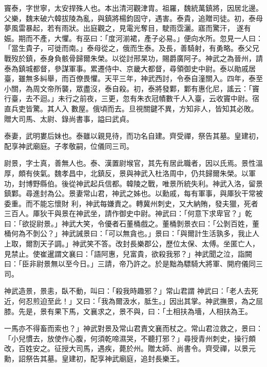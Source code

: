 \begin{pinyinscope}
 竇泰，字世寧，太安捍殊人也。本出清河觀津胄。祖羅，魏統萬鎮將，因居北邊。父樂，魏末破六韓拔陵為亂，與鎮將楊鈞固守，遇害。泰貴，追贈司徒。初，泰母夢風雷暴起，若有雨狀。出庭觀之，見電光奪目，駛雨霑灑。寤而驚汗，
 遂有娠。期而不產，大懼。有巫曰：「度河湔裙，產子必易。」便向水所。忽見一人曰：「當生貴子，可徙而南。」泰母從之，俄而生泰。及長，善騎射，有勇略。泰父兄戰歿於鎮，泰身負骸骨歸爾朱榮。以從討邢杲功，賜爵廣阿子。神武之為晉州，請泰為鎮城都督，參謀軍事。累遷侍中、京畿大都督，尋領御史中尉。泰以勛戚居臺，雖無多糾舉，而百僚畏懼。天平三年，神武西討，令泰自潼關入。四年，泰至小關，為周文帝所襲，眾盡沒，泰自殺。初，泰將發鄴，鄴有惠化尼，謠云：「竇行臺，去不迴。」未行之前夜，三更，忽有朱衣冠幘數千人入臺，云收竇中尉。宿直兵吏皆驚。其人入
 數屋。俄頃而去。旦視關鍵不異，方知非人，皆知其必敗。贈大司馬、太尉、錄尚書事，謚曰武貞。



 泰妻，武明婁后妹也。泰雖以親見待，而功名自建。齊受禪，祭告其墓。皇建初，配享神武廟庭。子孝敬嗣，位儀同三司。



 尉景，字士真，善無人也。泰、漢置尉堠官，其先有居此職者，因以氏焉。景性溫厚，頗有俠氣。魏孝昌中，北鎮反，景與神武入杜洛周中，仍共歸爾朱榮。以軍功，封博野縣伯。後從神武起兵信都。韓陵之戰，唯景所統失利。神武入洛，留景鎮鄴。尋進封為公。景妻常山君，神武之姊也。以勳戚，每有軍事，與厙狄干常被委重。而不能忘懷財
 利，神武每嫌責之。轉冀州刺史，又大納賄，發夫獵，死者三百人。厙狄干與景在神武坐，請作御史中尉。神武曰：「何意下求卑官？」乾曰：「欲捉尉景。」神武大笑，令優者石董桶戲之。董桶剝景衣曰：「公剝百姓，董桶何為不剝公？」神武誡景曰：「可以無貪也。」景曰：「與爾計生活孰多，我止人上取，爾割天子調。」神武笑不答。改封長樂郡公，歷位太保、太傅。坐匿亡人，見禁止。使崔暹謂文襄曰：「語阿惠，兒富貴，欲殺我邪？」神武聞之泣，詣闕曰：「臣非尉景無以至今日。」三請，帝乃許之。於是黜為驃騎大將軍、開府儀同三司。



 神武造景，景恚，臥不動，叫曰：「殺我時趣邪？」常山君謂
 神武曰：「老人去死近，何忍煎迫至此！」又曰：「我為爾汲水，胝生。」因出其掌。神武撫景，為之屈膝。先是，景有果下馬，文襄求之，景不與，曰：「土相扶為墻，人相扶為王。



 一馬亦不得畜而索也？」神武對景及常山君責文襄而杖之。常山君泣救之，景曰：「小兒慣去，放使作心腹，何須乾啼濕哭，不聽打邪？」尋授青州刺史，操行頗改，百姓安之。征授大司馬，遇疾，薨於州。贈太師、尚書令。齊受禪，以景元勳，詔祭告其墓。皇建初，配享神武廟庭，追封長樂王。




\end{pinyinscope}
